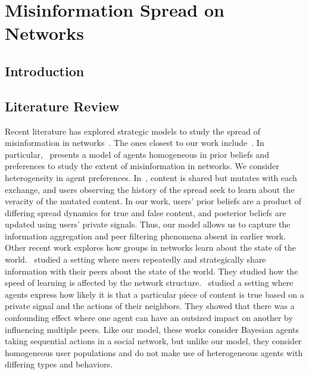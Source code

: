 \chapter{Misinformation Spread on Networks}\label{ch:misinfo}

\section{Introduction}

\section{Literature Review\label{sec:liter}} 
 Recent literature has explored strategic models to study the spread of misinformation in networks~\cite{sikder2020minimalistic, acemoglu2021model, jackson2022learning,mostagir2023social,bloch2018rumors, kranton2024social}. The ones closest to our work include~\cite{jackson2022learning, acemoglu2021model}. In particular,~\cite{acemoglu2021model} presents a model of agents homogeneous in prior beliefs and preferences to study the extent of misinformation in networks. We consider heterogeneity in agent preferences. In~\cite{jackson2022learning}, content is shared but mutates with each exchange, and users observing the history of the spread seek to learn about the veracity of the mutated content. In our work, users' prior beliefs are a product of differing spread dynamics for true and false content, and posterior beliefs are updated using users' private signals. Thus, our model allows us to capture the information aggregation and peer filtering phenomena absent in earlier work.
Other recent work explores how groups in networks learn about the state of the world.~\cite{huang2024learning} studied a setting where users repeatedly and strategically share information with their peers about the state of the world. They studied how the speed of learning is affected by the network structure.~\cite{dasaratha2019aggregative} studied a setting where agents express how likely it is that a particular piece of content is true based on a private signal and the actions of their neighbors. They showed that there was a confounding effect where one agent can have an outsized impact on another by influencing multiple peers. Like our model, these works consider Bayesian agents taking sequential actions in a social network, but unlike our model, they consider homogeneous user populations and do not make use of heterogeneous agents with differing types and  behaviors.  

